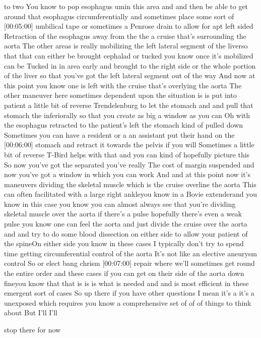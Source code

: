 \documentclass[
]{book}
\begin{document}
to two You know to pop esophagus umin this area and and then be able to
get around that esophagus circumferentially and sometimes place some
sort of {[}00:05:00{]} umbilical tape or sometimes a Penrose drain to allow
for apt left sided Retraction of the esophagus away from the the a
cruise that's surrounding the aorta The other areas is really mobilizing
the left lateral segment of the liverso that that can either be brought
cephalad or tucked you know once it's mobilized can be Tucked in in area
early and brought to the right side or the whole portion of the liver so
that you've got the left lateral segment out of the way And now at this
point you know one is left with the cruise that's overlying the aorta
The other maneuver here sometimes dependent upon the situation is is put
into patient a little bit of reverse Trendelenburg to let the stomach
and and pull that stomach the inferiorally so that you create as big a
window as you can Oh with the esophagus retracted to the patient's left
the stomach kind of pulled down Sometimes you can have a resident or a
an assistant put their hand on the {[}00:06:00{]} stomach and retract it
towards the pelvis if you will Sometimes a little bit of reverse T-Bird
helps with that and you can kind of hopefully picture this So now you've
got the separated you've really The cost of margin suspended and now
you've got a window in which you can work And and at this point now it's
maneuvers dividing the skeletal muscle which is the cruise overline the
aorta This can often facilitated with a large right ankleyou know in a
Bovie extenderand you know in this case you know you can almost always
see that you're dividing skeletal muscle over the aorta if there's a
pulse hopefully there's even a weak pulse you know one can feel the
aorta and just divide the cruise over the aorta and and try to do some
blood dissection on either side to allow your patient of the spineOn
either side you know in these cases I typically don't try to spend time
getting circumferential control of the aorta It's not like an elective
aneurysm control So or elect bang chrism {[}00:07:00{]} repair where we'll
sometimes get round the entire order and these cases if you can get on
their side of the aorta down fineyou know that that is is is what is
needed and and is most efficient in these emergent sort of cases So up
there if you have other questions I mean it's a it's a unexposed which
requires you know a comprehensive set of of of things to think about But
I'll I'll

stop there for now
\end{document}
